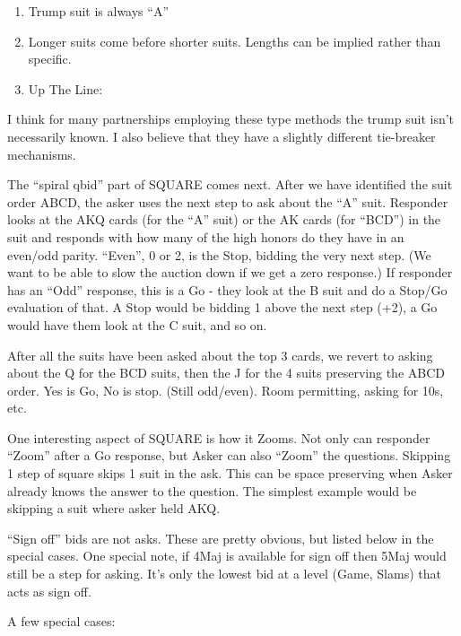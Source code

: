 \documentclass[tom-ari]{subfile}
\begin{document}
\begin{enumerate}
	\item Trump suit is always ``A''
	\item Longer suits come before shorter suits. Lengths can be implied rather than specific.
	\item Up The Line: \clubsuit \diamondsuit \heartsuit \spadesuit 
\end{enumerate}

I think for many partnerships employing these type methods the trump suit isn't necessarily known.  I also believe that they have a slightly different tie-breaker mechanisms.  

The ``spiral qbid'' part of SQUARE comes next.  After we have identified the suit order ABCD, the asker uses the next step to ask about the ``A'' suit.  Responder looks at the AKQ cards (for the ``A'' suit) or the AK cards (for ``BCD'') in the suit and responds with how many of the high honors do they have in an even/odd parity.  ``Even'', 0 or 2, is the Stop, bidding the very next step.  (We want to be able to slow the auction down if we get a zero response.)  If responder has an ``Odd'' response, this is a Go - they look at the B suit and do a Stop/Go evaluation of that.  A Stop would be bidding 1 above the next step (+2), a Go would have them look at the C suit, and so on.

After all the suits have been asked about the top 3 cards, we revert to asking about the Q for the BCD suits, then the J for the 4 suits preserving the ABCD order.  Yes is Go, No is stop.  (Still odd/even).  Room permitting, asking for 10s, etc.

One interesting aspect of SQUARE is how it Zooms.  Not only can responder ``Zoom'' after a Go response, but Asker can also ``Zoom'' the questions.  Skipping 1 step of square skips 1 suit in the ask.  This can be space preserving when Asker already knows the answer to the question.  The simplest example would be skipping a suit where asker held AKQ.

``Sign off'' bids are not asks. These are pretty obvious, but listed below in the special cases.  One special note, if 4Maj is available for sign off then 5Maj would still be a step for asking.  It's only the lowest bid at a level (Game, Slams) that acts as sign off.

A few special cases:  
\end{document}
